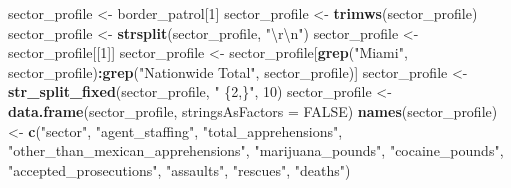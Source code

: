 \documentclass[
  12pt,
]{book}
\newenvironment{Shaded}{\begin{snugshade}}{\end{snugshade}}
\newcommand{\CharTok}[1]{\textcolor[rgb]{0.5,0.5,0.5}{#1}}
\newcommand{\DataTypeTok}[1]{\textcolor[rgb]{0.27,0.27,0.27}{#1}}
\newcommand{\DecValTok}[1]{\textcolor[rgb]{0.06,0.06,0.06}{#1}}
\newcommand{\KeywordTok}[1]{\textcolor[rgb]{0.27,0.27,0.27}{\textbf{#1}}}
\newcommand{\NormalTok}[1]{#1}
\newcommand{\OperatorTok}[1]{\textcolor[rgb]{0.43,0.43,0.43}{\textbf{#1}}}
\newcommand{\OtherTok}[1]{\textcolor[rgb]{0.37,0.37,0.37}{#1}}
\newcommand{\StringTok}[1]{\textcolor[rgb]{0.5,0.5,0.5}{#1}}
\begin{document}
\begin{Shaded}
\begin{Highlighting}[]
\NormalTok{sector\_profile <{-}}\StringTok{ }\NormalTok{border\_patrol[}\DecValTok{1}\NormalTok{]}
\NormalTok{sector\_profile <{-}}\StringTok{ }\KeywordTok{trimws}\NormalTok{(sector\_profile)}
\NormalTok{sector\_profile <{-}}\StringTok{ }\KeywordTok{strsplit}\NormalTok{(sector\_profile, }\StringTok{"}\CharTok{\textbackslash{}r\textbackslash{}n}\StringTok{"}\NormalTok{)}
\NormalTok{sector\_profile <{-}}\StringTok{ }\NormalTok{sector\_profile[[}\DecValTok{1}\NormalTok{]]}
\NormalTok{sector\_profile <{-}}\StringTok{ }\NormalTok{sector\_profile[}\KeywordTok{grep}\NormalTok{(}\StringTok{"Miami"}\NormalTok{, sector\_profile)}\OperatorTok{:}\KeywordTok{grep}\NormalTok{(}\StringTok{"Nationwide Total"}\NormalTok{, sector\_profile)]}
\NormalTok{sector\_profile <{-}}\StringTok{ }\KeywordTok{str\_split\_fixed}\NormalTok{(sector\_profile, }\StringTok{" \{2,\}"}\NormalTok{, }\DecValTok{10}\NormalTok{)}
\NormalTok{sector\_profile <{-}}\StringTok{ }\KeywordTok{data.frame}\NormalTok{(sector\_profile, }\DataTypeTok{stringsAsFactors =} \OtherTok{FALSE}\NormalTok{)}
\KeywordTok{names}\NormalTok{(sector\_profile) <{-}}\StringTok{ }\KeywordTok{c}\NormalTok{(}\StringTok{"sector"}\NormalTok{,}
                           \StringTok{"agent\_staffing"}\NormalTok{,}
                           \StringTok{"total\_apprehensions"}\NormalTok{,}
                           \StringTok{"other\_than\_mexican\_apprehensions"}\NormalTok{, }
                           \StringTok{"marijuana\_pounds"}\NormalTok{,}
                           \StringTok{"cocaine\_pounds"}\NormalTok{,}
                           \StringTok{"accepted\_prosecutions"}\NormalTok{,}
                           \StringTok{"assaults"}\NormalTok{,}
                           \StringTok{"rescues"}\NormalTok{,}
                           \StringTok{"deaths"}\NormalTok{)}
\end{Highlighting}
\end{Shaded}
\end{document}
